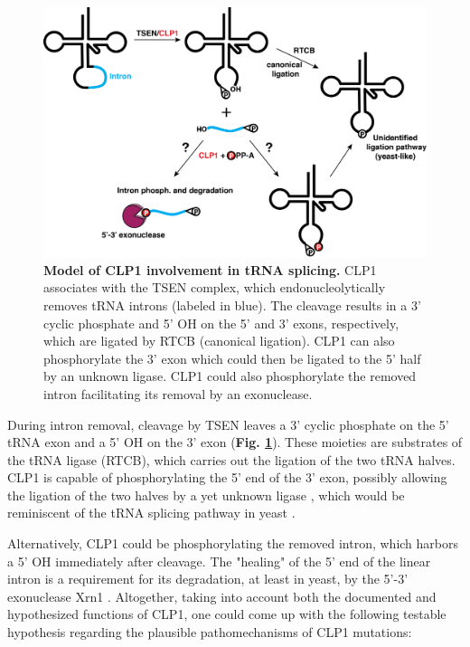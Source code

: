 \documentclass[12pt]{rockefeller}
\begin{document}
\begin{figure}[!ht]%
\centering
\includegraphics[width=\textwidth]{splicing2_v2.png}%
\caption[Model of CLP1 involvement in tRNA splicing.]
{\textbf{Model of CLP1 involvement in tRNA splicing.}
CLP1 associates with the TSEN complex, which endonucleolytically removes tRNA introns (labeled in blue). The cleavage results in a 3' cyclic phosphate and 5' OH on the 5' and 3' exons, respectively, which are ligated by RTCB (canonical ligation). CLP1 can also phosphorylate the 3' exon which could then be ligated to the 5' half by an unknown ligase. CLP1 could also phosphorylate the removed intron facilitating its removal by an exonuclease.}
\centering
\label{splicing}%
\end{figure}

During intron removal, cleavage by \gls{TSEN} leaves a 3' cyclic phosphate on the 5' tRNA exon and a 5' OH on the 3' exon (\textbf{Fig. \ref{splicing}}). These moieties are substrates of the tRNA ligase (RTCB), which carries out the ligation of the two tRNA halves. CLP1 is capable of phosphorylating the 5' end of the 3' exon, possibly allowing the ligation of the two halves by a yet unknown ligase \cite{Weitzer:2007hda}, which would be reminiscent of the tRNA splicing pathway in yeast \cite{Weitzer:2014bi}. 

Alternatively, CLP1 could be phosphorylating the removed intron, which harbors a 5' OH immediately after cleavage. The "healing" of the 5' end of the linear intron is a requirement for its degradation, at least in yeast, by the 5'-3' exonuclease Xrn1 \cite{Wu:2014fb}.
Altogether, taking into account both the documented and hypothesized functions of CLP1, one could come up with the following testable hypothesis regarding the plausible pathomechanisms of CLP1 mutations:
	
\end{document}

